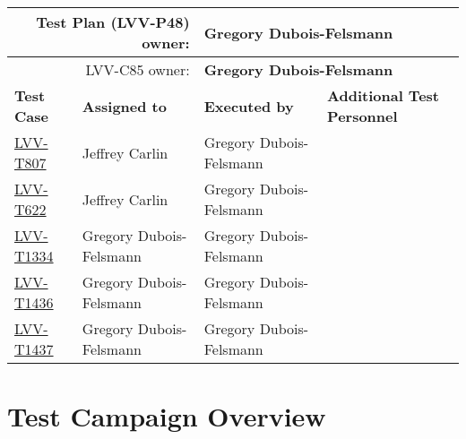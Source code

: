 \documentclass[DM,STR,toc]{lsstdoc}
\begin{document}
\begin{longtable}{p{3cm}p{3cm}p{3cm}p{6cm}}
\hline
\multicolumn{2}{r}{Test Plan (LVV-P48) owner:} &
\multicolumn{2}{l}{\textbf{ Gregory Dubois-Felsmann } }\\\hline
\multicolumn{2}{r}{ LVV-C85 owner:} &
\multicolumn{2}{l}{\textbf{
    Gregory Dubois-Felsmann
}
} \\\hline
\textbf{Test Case} & \textbf{Assigned to} & \textbf{Executed by} & \textbf{Additional Test Personnel} \\ \hline
\href{https://jira.lsstcorp.org/secure/Tests.jspa#/testCase/LVV-T807}{LVV-T807}
& {\small Jeffrey Carlin } & {\small Gregory Dubois-Felsmann } &
\begin{minipage}[]{6cm}
\smallskip
{\small  }
\medskip
\end{minipage}
\\ \hline
\href{https://jira.lsstcorp.org/secure/Tests.jspa#/testCase/LVV-T622}{LVV-T622}
& {\small Jeffrey Carlin } & {\small Gregory Dubois-Felsmann } &
\begin{minipage}[]{6cm}
\smallskip
{\small  }
\medskip
\end{minipage}
\\ \hline
\href{https://jira.lsstcorp.org/secure/Tests.jspa#/testCase/LVV-T1334}{LVV-T1334}
& {\small Gregory Dubois-Felsmann } & {\small Gregory Dubois-Felsmann } &
\begin{minipage}[]{6cm}
\smallskip
{\small  }
\medskip
\end{minipage}
\\ \hline
\href{https://jira.lsstcorp.org/secure/Tests.jspa#/testCase/LVV-T1436}{LVV-T1436}
& {\small Gregory Dubois-Felsmann } & {\small Gregory Dubois-Felsmann } &
\begin{minipage}[]{6cm}
\smallskip
{\small  }
\medskip
\end{minipage}
\\ \hline
\href{https://jira.lsstcorp.org/secure/Tests.jspa#/testCase/LVV-T1437}{LVV-T1437}
& {\small Gregory Dubois-Felsmann } & {\small Gregory Dubois-Felsmann } &
\begin{minipage}[]{6cm}
\smallskip
{\small  }
\medskip
\end{minipage}
\\ \hline
\end{longtable}

\newpage

\section{Test Campaign Overview}
\label{sect:overview}
\end{document}
